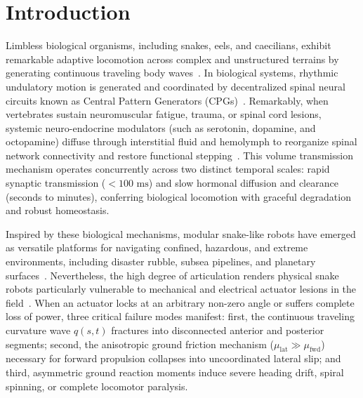 \documentclass{iopjournal}
\begin{document}
\section{Introduction}
\label{sec:intro}

Limbless biological organisms, including snakes, eels, and caecilians, exhibit remarkable adaptive locomotion across complex and unstructured terrains by generating continuous traveling body waves~\cite{dickinson2000,hirose1993}. In biological systems, rhythmic undulatory motion is generated and coordinated by decentralized spinal neural circuits known as Central Pattern Generators (CPGs)~\cite{grillner2006,guertin2013,marder2001}. Remarkably, when vertebrates sustain neuromuscular fatigue, trauma, or spinal cord lesions, systemic neuro-endocrine modulators (such as serotonin, dopamine, and octopamine) diffuse through interstitial fluid and hemolymph to reorganize spinal network connectivity and restore functional stepping~\cite{courtine2008,rossignol2011,bargmann2012,sillar2014,edgerton2004}. This volume transmission mechanism operates concurrently across two distinct temporal scales: rapid synaptic transmission ($<100\text{ ms}$) and slow hormonal diffusion and clearance (seconds to minutes), conferring biological locomotion with graceful degradation and robust homeostasis.

Inspired by these biological mechanisms, modular snake-like robots have emerged as versatile platforms for navigating confined, hazardous, and extreme environments, including disaster rubble, subsea pipelines, and planetary surfaces~\cite{transeth2009,liljeback2012,wright2012,crespi2008}. Nevertheless, the high degree of articulation renders physical snake robots particularly vulnerable to mechanical and electrical actuator lesions in the field~\cite{schmucker2022,elsayed2021,sartoretti2019}. When an actuator locks at an arbitrary non-zero angle or suffers complete loss of power, three critical failure modes manifest: first, the continuous traveling curvature wave $q(s, t)$ fractures into disconnected anterior and posterior segments; second, the anisotropic ground friction mechanism ($\mu_{\text{lat}} \gg \mu_{\text{fwd}}$) necessary for forward propulsion collapses into uncoordinated lateral slip; and third, asymmetric ground reaction moments induce severe heading drift, spiral spinning, or complete locomotor paralysis.
\end{document}
